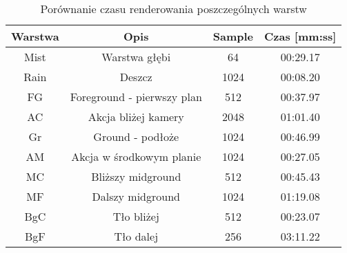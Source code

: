 \begin{table}[hbtp]
    \centering
    \caption{Porównanie czasu renderowania poszczególnych warstw}\vspace{0.5ex}
    \begin{tabular}{|| c c c c ||}
        \hline
        Warstwa & Opis & Sample & Czas [mm:ss] \\ [0.5ex]
        \hline\hline
        Mist & Warstwa głębi & 64 & 00:29.17 \\
        \hline
        Rain & Deszcz & 1024 & 00:08.20 \\
        \hline
        FG & Foreground - pierwszy plan & 512 &   00:37.97 \\
        \hline
        AC & Akcja bliżej kamery & 2048 &  01:01.40 \\
        \hline
        Gr & Ground - podłoże & 1024 & 00:46.99 \\
        \hline
        AM & Akcja w środkowym planie & 1024 & 00:27.05 \\
        \hline
        MC & Bliższy midground & 512 & 00:45.43 \\
        \hline
        MF & Dalszy midground & 1024 & 01:19.08 \\
        \hline
        BgC & Tło bliżej & 512 & 00:23.07 \\
        \hline
        BgF & Tło dalej & 256 & 03:11.22 \\ [1ex]
        \hline
    \end{tabular}
    \label{tab:render-info}
\end{table}